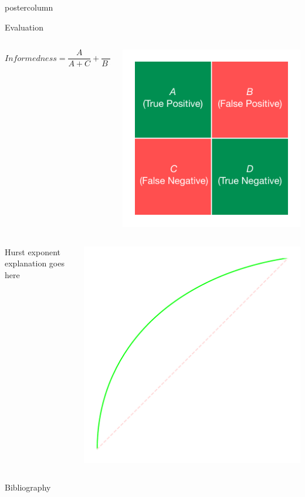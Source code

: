 \documentclass[final,hyperref={pdfpagelabels=false}]{beamer}
\begin{document}
\begin{frame}
\begin{columns}
\begin{column}{.49\textwidth}
\begin{beamercolorbox}[center,wd=\textwidth]{postercolumn}
\begin{minipage}[T]{.95\textwidth}
{\begin{block}{Evaluation}
\begin{itemize}
\begin{columns}
\begin{column}{.30\textwidth}
			       $$ Informedness = \frac{A}{A+C} + \frac{B}{B+D}$$
			       \end{column}
                		       \begin{column}{.38\textwidth}
		                         \includegraphics[width=0.65\linewidth]{figures/truth_table}
	       		       \end{column}
			       \end{columns}
			       \begin{columns}
			       \begin{column}{.60\textwidth}
			       Hurst exponent explanation goes here \cite{hurst_long-term_1951} 
			       \end{column}
			       \begin{column}{.38\textwidth}
			       	\includegraphics[width=0.65\linewidth]{figures/ROC}
			       \end{column}
			       \end{columns}
                \end{itemize}
            \end{block}
            \begin{block}{Bibliography}
	   
            
            \end{block}
          }


\end{minipage}
\end{beamercolorbox}
\end{column}
\end{columns}
\end{frame}
\end{document}
